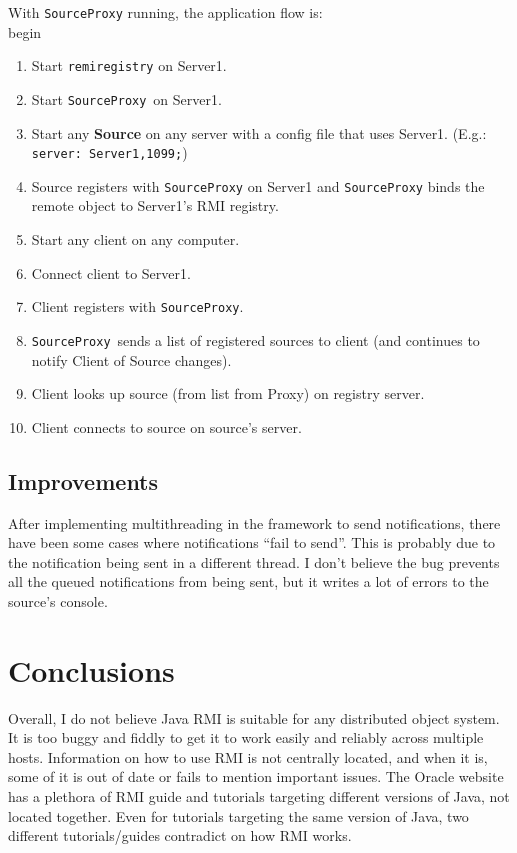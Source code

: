 \documentclass[a4paper]{article}
\begin{document}
With \texttt{SourceProxy} running, the application flow is:
\\begin{\begin{enumerate}
  \item Start \texttt{remiregistry} on Server1.
  \item Start \texttt{SourceProxy} on Server1.
  \item Start any \textbf{Source} on any server with a config file that uses Server1. (E.g.: \texttt{server: Server1,1099;})
  \item Source registers with \texttt{SourceProxy} on Server1 and \texttt{SourceProxy} binds the remote object to Server1's RMI registry.
  \item Start any client on any computer.
  \item Connect client to Server1.
  \item Client registers with \texttt{SourceProxy}.
  \item \texttt{SourceProxy} sends a list of registered sources to client (and continues to notify Client of Source changes).
  \item Client looks up source (from list from Proxy) on registry server.
  \item Client connects to source on source's server.
\end{enumerate}}

\subsection{Improvements}
After implementing multithreading in the framework to send notifications, there have been some cases where notifications ``fail to send''.
This is probably due to the notification being sent in a different thread.
I don't believe the bug prevents all the queued notifications from being sent, but it writes a lot of errors to the source's console.

\section{Conclusions}
Overall, I do not believe Java RMI is suitable for any distributed object system.
It is too buggy and fiddly to get it to work easily and reliably across multiple hosts.
Information on how to use RMI is not centrally located, and when it is, some of it is out of date or fails to mention important issues.
The Oracle website has a plethora of RMI guide and tutorials targeting different versions of Java, not located together.
Even for tutorials targeting the same version of Java, two different tutorials/guides contradict on how RMI works.
\end{document}
